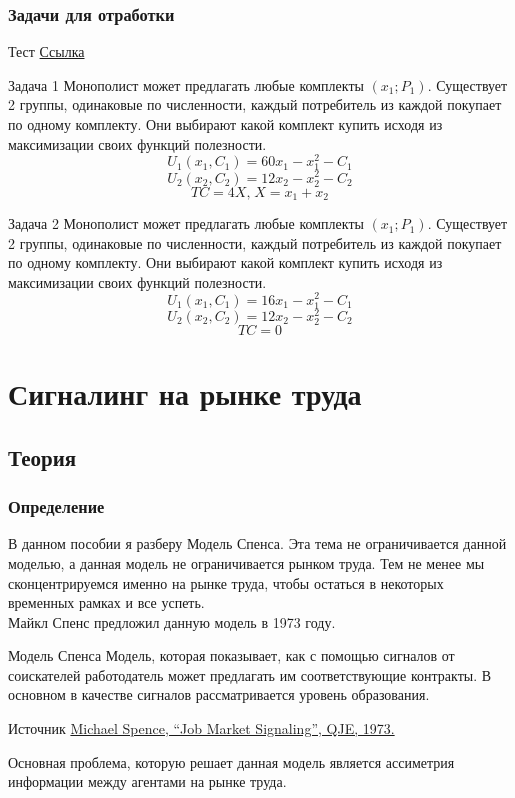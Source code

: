\subsection{Задачи для отработки}
\begin{mybox}{Тест}
    \href{https://forms.gle/Ka76oAsLQDdQsKNR9}{Ссылка}
\end{mybox}

\begin{mybox}{Задача 1}
Монополист может предлагать любые комплекты $(x_1;P_1)$. Существует 2 группы, одинаковые по численности, каждый потребитель из каждой покупает по одному комплекту. Они выбирают какой комплект купить исходя из максимизации своих функций полезности. \\
$$U_1(x_1,C_1)=60x_1-x_1^2-C_1$$
$$U_2(x_2,C_2)=12x_2-x_2^2-C_2$$
$$TC=4X\text{,}\;X=x_1+x_2$$
\end{mybox}

\begin{mybox}{Задача 2}
Монополист может предлагать любые комплекты $(x_1;P_1)$. Существует 2 группы, одинаковые по численности, каждый потребитель из каждой покупает по одному комплекту. Они выбирают какой комплект купить исходя из максимизации своих функций полезности. \\
$$U_1(x_1,C_1)=16x_1-x_1^2-C_1$$
$$U_2(x_2,C_2)=12x_2-x_2^2-C_2$$
$$TC=0$$
\end{mybox}

\newpage
\chapter{Сигналинг на рынке труда}
\section{Теория}
\subsection{Определение}
\indent\setlength{\parindent}{1em}В данном пособии я разберу Модель Спенса. Эта тема не ограничивается данной моделью, а данная модель не ограничивается рынком труда. Тем не менее мы сконцентрируемся именно на рынке труда, чтобы остаться в некоторых временных рамках и все успеть. \smallskip\\
\indent\setlength{\parindent}{1em}Майкл Спенс предложил данную модель в 1973 году.
\
\begin{mybox}{Модель Спенса}
Модель, которая показывает, как с помощью сигналов от соискателей работодатель может предлагать им соответствующие контракты. В основном в качестве сигналов рассматривается уровень образования.
\end{mybox}
\begin{mybox}{Источник}
    \href{https://www.sfu.ca/~allen/Spence.pdf}{Michael Spence, “Job Market Signaling”, QJE, 1973.}
\end{mybox}
\indent\setlength{\parindent}{1em}Основная проблема, которую решает данная модель является ассиметрия информации между агентами на рынке труда.
